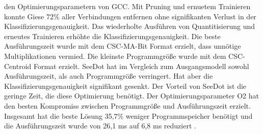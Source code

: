 den Optimierungsparametern von GCC. Mit Pruning und ernuetem Trainieren konnte Giese 72\% aller Verbindungen entfernen ohne signifikanten Verlust in der Klassifizierungsgenauigkeit. Das wiederholte Ausführen von Quantitisierung und
erneutes Trainieren erhöhte die Klassifizierungsgenauigkeit. Die beste Ausführungszeit wurde mit dem CSC-MA-Bit Format erzielt, dass unnötige Multiplikationen vermied. Die kleinste Programmgröße wurde mit dem
CSC-Centroid Format erzielt. SeeDot hat im Vergleich zum Ausgangsmodell sowohl Ausführungszeit, als auch Programmgröße verringert. Hat aber die Klassifizierungsgenauigkeit signifikant gesenkt. Der Vorteil von SeeDot
ist die geringe Zeit, die diese Optimierung benötigt. Der Optimierungsparameter O2 hat den besten Kompromiss zwischen Programmgröße und Ausführungszeit erzielt. Insgesamt hat die beste Lösung 35,7\% weniger Programmspeicher
benötigt und die Ausführungszeit wurde von 26,1 ms auf 6,8 ms reduziert \cite{gieseThesis}.